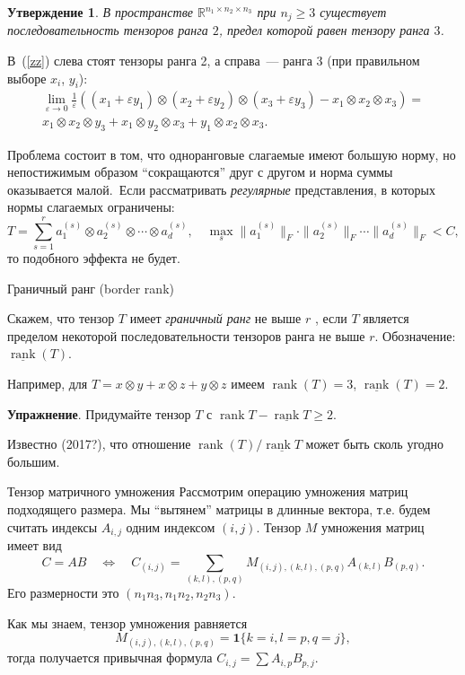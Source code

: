 \documentclass[handout]{beamer}
\renewcommand\ge{\geqslant}
\newcommand\R{\mathbb R}
\newcommand\eps{\varepsilon}
\newtheorem*{statement}{Утверждение}
\DeclareMathOperator{\rank}{rank}
\begin{document}
\begin{frame}
    \begin{statement}
        В пространстве $\R^{n_1\times n_2\times n_3}$ при $n_j\ge3$ существует
        последовательность тензоров ранга $2$, предел которой равен тензору
        ранга $3$.
    \end{statement}
    В~(\ref{zz}) слева стоят тензоры ранга 2, а справа~--- ранга 3 (при правильном
    выборе $x_i$, $y_i$):
    \begin{multline}
        \label{zz}
    \lim_{\eps\to0}\frac1\eps((x_1+\eps y_1)\otimes(x_2+\eps
    y_2)\otimes(x_3+\eps y_3) - x_1\otimes x_2\otimes x_3) =\\
    x_1\otimes x_2\otimes y_3 + x_1\otimes y_2\otimes x_3 + y_1\otimes
        x_2\otimes x_3. 
    \end{multline}
    \pause

    Проблема состоит в том, что одноранговые слагаемые имеют большую норму, но
    непостижимым образом ``сокращаются'' друг с другом и норма суммы оказывается
    малой.\pause~Если рассматривать \textit{регулярные} представления,
    в которых нормы слагаемых ограничены:
    $$
    T = \sum_{s=1}^r a^{(s)}_1\otimes a^{(s)}_2\otimes\cdots\otimes
    a^{(s)}_d,\quad
    \max_s \|a^{(s)}_1\|_F\cdot\|a^{(s)}_2\|_F\cdots\|a^{(s)}_d\|_F < C,
    $$
    то подобного эффекта не будет.
\end{frame}


\begin{frame}{Граничный ранг (border rank)}

    Скажем, что тензор $T$ имеет \textit{граничный ранг} не выше $r$ , если $T$
    является пределом некоторой последовательности тензоров ранга не выше $r$.
    Обозначение:
    $\underline{\rank}(T)$.
    \pause\vspace{5pt}

    Например, для $T=x\otimes y+x\otimes z+y\otimes z$ имеем $\rank(T)=3$,
    $\underline{\rank}(T)=2$.
    \pause\vspace{5pt}

    \textbf{Упражнение}. Придумайте тензор $T$ с $\rank T-\underline{\rank}T\ge
    2$.
    \pause\vspace{5pt}

    Известно (2017?), что отношение $\rank(T)/\underline{\rank T}$ может быть сколь
    угодно большим.
\end{frame}


\begin{frame}{Тензор матричного умножения}
    Рассмотрим
    операцию умножения матриц подходящего размера. Мы ``вытянем'' матрицы в
    длинные вектора, т.е. будем считать индексы $A_{i,j}$ одним индексом
    $(i,j)$.
    \pause\vspace{5pt}
    Тензор $M$ умножения матриц имеет вид
    $$
    C=AB \quad\Leftrightarrow\quad C_{(i,j)} = \sum_{(k,l),(p,q)}
    M_{(i,j),(k,l),(p,q)}A_{(k,l)}B_{(p,q)}.
    $$
    Его размерности это $(n_1n_3,n_1n_2,n_2n_3)$.
    \pause

    Как мы знаем, тензор умножения равняется
    $$
    M_{(i,j),(k,l),(p,q)} = \mathbf{1}\{k=i,l=p,q=j\},
    $$
    тогда получается привычная формула $C_{i,j}=\sum A_{i,p}B_{p,j}$.
\end{frame}
\end{document}
